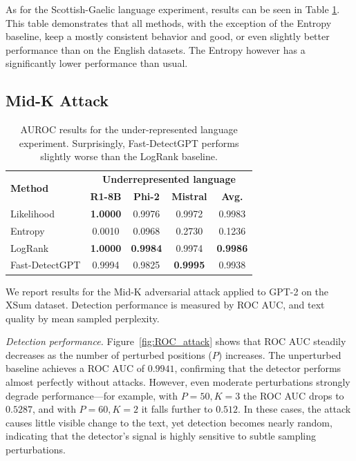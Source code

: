 \documentclass[11pt]{article}
\begin{document}
As for the Scottish-Gaelic language experiment, results can be seen in Table \ref{tab:scotgal_results}. This table demonstrates that all methods, with the exception of the Entropy baseline, keep a mostly consistent behavior and good, or even slightly better performance than on the English datasets. The Entropy however has a significantly lower performance than usual.

\subsection{Mid-K Attack}

\begin{table}[H]
    \centering
    \small
    \begin{tabular}{l|ccc|c}
    \toprule
    \multirow{2}{*}{\textbf{Method}} & \multicolumn{4}{c}{\textbf{Underrepresented language}} \\
    \cmidrule{2-5}
    & \textbf{R1-8B} & \textbf{Phi-2} & \textbf{Mistral} & \textbf{Avg.} \\
    \midrule
    Likelihood & \textbf{1.0000} & 0.9976 & 0.9972 & 0.9983 \\
    Entropy & 0.0010 & 0.0968 & 0.2730 & 0.1236 \\
    LogRank & \textbf{1.0000} & \textbf{0.9984} & 0.9974 & \textbf{0.9986} \\
    \midrule
    Fast-DetectGPT & 0.9994 & 0.9825 & \textbf{0.9995} & 0.9938 \\
    \bottomrule
    \end{tabular}
    
    \caption{AUROC results for the under-represented language experiment. Surprisingly, Fast-DetectGPT performs slightly worse than the LogRank baseline.}
    \label{tab:scotgal_results}
\end{table}
We report results for the Mid-K adversarial attack applied to GPT-2 on the XSum dataset. Detection performance is measured by ROC AUC, and text quality by mean sampled perplexity.

\textit{Detection performance.} Figure~\ref{fig:ROC_attack} shows that ROC AUC steadily decreases as the number of perturbed positions ($P$) increases. The unperturbed baseline achieves a ROC AUC of $0.9941$, confirming that the detector performs almost perfectly without attacks. However, even moderate perturbations strongly degrade performance—for example, with $P=50, K=3$ the ROC AUC drops to $0.5287$, and with $P=60, K=2$ it falls further to $0.512$. In these cases, the attack causes little visible change to the text, yet detection becomes nearly random, indicating that the detector’s signal is highly sensitive to subtle sampling perturbations.
\end{document}
